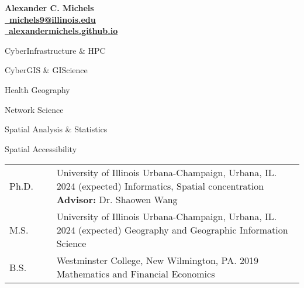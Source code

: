 \documentclass{acmcv}
\begin{document}
	\begin{multicols}{2}
		\vspace*{.15cm}
		\textbf{\LARGE Alexander C. Michels} \\
		\columnbreak
		\hfill\href{mailto:michels9@illinois.edu}{\textbf{\faEnvelope~michels9@illinois.edu}} \\
		\hfill\href{http://alexandermichels.github.io}{\faGlobeAmericas~\textbf{alexandermichels.github.io}} \\
	\end{multicols}

	
	\begin{multicols}{2}
		\begin{titemize}
			\item CyberInfrastructure \& HPC
			\item CyberGIS \& GIScience
			\item Health Geography
			\item Network Science
			\item Spatial Analysis \& Statistics
			\item Spatial Accessibility
		\end{titemize}
	\end{multicols}


    \begin{longtable}{p{0.16\linewidth} p{0.84\linewidth}}
        Ph.D. & University of Illinois Urbana-Champaign, Urbana, IL. 2024 (expected) \newline Informatics, Spatial concentration \newline \textbf{Advisor:} Dr. Shaowen Wang \\

        M.S. & University of Illinois Urbana-Champaign, Urbana, IL. 2024 (expected) \newline Geography and Geographic Information Science\\

        B.S. & Westminster College, New Wilmington, PA. 2019 \newline Mathematics and Financial Economics\\
    \end{longtable}
\end{document}
